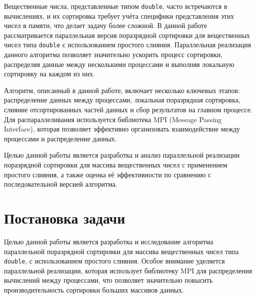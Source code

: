 \documentclass[12pt]{article}
\begin{document}
Вещественные числа, представленные типом \texttt{double}, часто встречаются в вычислениях, и их сортировка требует учёта специфики представления этих чисел в памяти, что делает задачу более сложной. В данной работе рассматривается параллельная версия поразрядной сортировки для вещественных чисел типа \texttt{double} с использованием простого слияния. Параллельная реализация данного алгоритма позволяет значительно ускорить процесс сортировки, распределяя данные между несколькими процессами и выполняя локальную сортировку на каждом из них.

Алгоритм, описанный в данной работе, включает несколько ключевых этапов: распределение данных между процессами, локальная поразрядная сортировка, слияние отсортированных частей данных и сбор результатов на главном процессе. Для распараллеливания используется библиотека MPI (Message Passing Interface), которая позволяет эффективно организовать взаимодействие между процессами и распределение данных.

Целью данной работы является разработка и анализ параллельной реализации поразрядной сортировки для массива вещественных чисел с применением простого слияния, а также оценка её эффективности по сравнению с последовательной версией алгоритма.

\newpage

\section*{Постановка задачи} 

\hspace*{1.25em}Целью данной работы является разработка и исследование алгоритма параллельной поразрядной сортировки для массива вещественных чисел типа \texttt{double}, с использованием простого слияния. Особое внимание уделяется параллельной реализации, которая использует библиотеку MPI для распределения вычислений между процессами, что позволяет значительно повысить производительность сортировки больших массивов данных.
\end{document}
